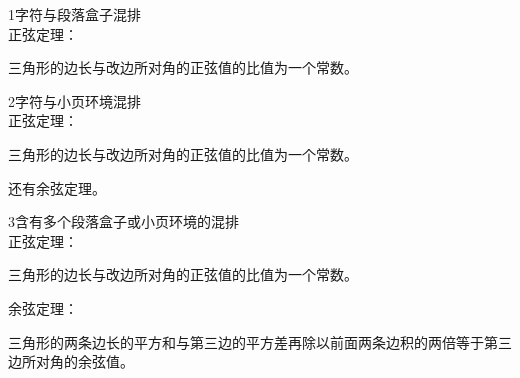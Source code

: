 \documentclass{ctexart}
\begin{document}
1字符与段落盒子混排\\



正弦定理：\parbox[t][2.5cm][b]{4cm}{三角形的边长与改边所对角的正弦值的比值为一个常数。}

2字符与小页环境混排\\

正弦定理：\begin{minipage}[t]{4cm}三角形的边长与改边所对角的正弦值的比值为一个常数。
\end{minipage} 还有余弦定理。

3含有多个段落盒子或小页环境的混排\\

正弦定理：\parbox[t]{4cm}{三角形的边长与改边所对角的正弦值的比值为一个常数。} \qquad%
余弦定理：\parbox[6]{6.2cm}{三角形的两条边长的平方和与第三边的平方差再除以前面两条边积的两倍等于第三边所对角的余弦值。}
\end{document}
